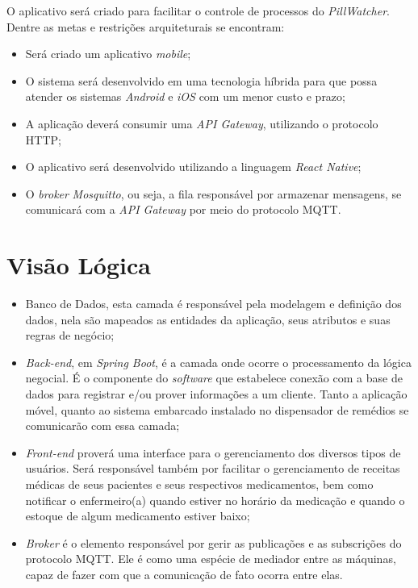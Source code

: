 \begin{apendicesenv}
O aplicativo será criado para facilitar o controle de processos do \textit{PillWatcher}.
Dentre as metas e restrições arquiteturais se encontram:

\begin{itemize}
    \item Será criado um aplicativo \textit{mobile};
    \item O sistema será desenvolvido em uma tecnologia híbrida para que possa atender os sistemas \textit{Android} e \textit{iOS} com um menor custo e prazo;
        \item A aplicação deverá consumir uma \textit{API Gateway}, utilizando o protocolo HTTP;
    \item O aplicativo será desenvolvido utilizando a linguagem \textit{React Native};
    \item O \emph{broker} \textit{Mosquitto}, ou seja, a fila responsável por armazenar mensagens, se comunicará com a \textit{API Gateway} por meio do protocolo MQTT.
\end{itemize}

\section{Visão Lógica}

\begin{itemize}
    \item Banco de Dados, esta camada é responsável pela modelagem e definição dos dados, nela são mapeados as entidades da aplicação, seus atributos e suas regras de negócio;
    \item \textit{Back-end}, em \textit{Spring Boot}, é a camada onde ocorre o processamento da lógica negocial. É o componente do \textit{software} que estabelece conexão com a base de dados para registrar e/ou prover informações a um cliente. Tanto a aplicação móvel, quanto ao sistema embarcado instalado no dispensador de remédios se comunicarão com essa camada;
    \item \textit{Front-end} proverá uma interface para o gerenciamento dos diversos tipos de usuários. Será responsável também por facilitar o gerenciamento de receitas médicas de seus pacientes e seus respectivos medicamentos, bem como notificar o enfermeiro(a) quando estiver no horário da medicação e quando o estoque de algum medicamento estiver baixo;
    \item \textit{Broker} é o elemento responsável por gerir as publicações e as subscrições do protocolo MQTT. Ele é como uma espécie de mediador entre as máquinas, capaz de fazer com que a comunicação de fato ocorra entre elas.
\end{itemize}


\end{apendicesenv}
